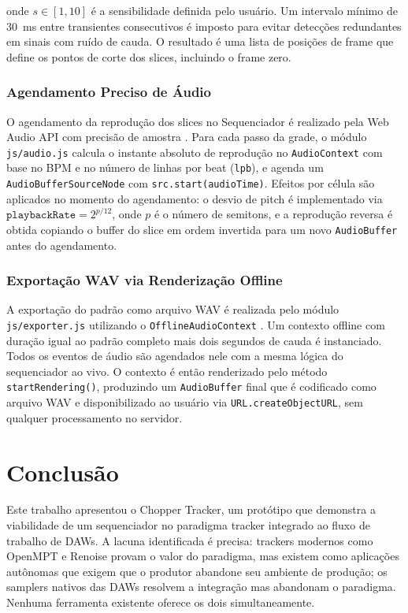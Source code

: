 \documentclass[portuguese]{sbc2025}
\begin{document}
onde $s \in [1,10]$ é a sensibilidade definida pelo usuário. Um intervalo mínimo de 30~ms entre transientes consecutivos é imposto para evitar detecções redundantes em sinais com ruído de cauda. O resultado é uma lista de posições de frame que define os pontos de corte dos slices, incluindo o frame zero.

\subsubsection{Agendamento Preciso de Áudio}

O agendamento da reprodução dos slices no Sequenciador é realizado pela Web Audio API com precisão de amostra \citep{webaudioapi2021}. Para cada passo da grade, o módulo \texttt{js/audio.js} calcula o instante absoluto de reprodução no \texttt{AudioContext} com base no BPM e no número de linhas por beat (\texttt{lpb}), e agenda um \texttt{AudioBufferSourceNode} com \texttt{src.start(audioTime)}. Efeitos por célula são aplicados no momento do agendamento: o desvio de pitch é implementado via $\texttt{playbackRate} = 2^{p/12}$, onde $p$ é o número de semitons, e a reprodução reversa é obtida copiando o buffer do slice em ordem invertida para um novo \texttt{AudioBuffer} antes do agendamento.

\subsubsection{Exportação WAV via Renderização Offline}

A exportação do padrão como arquivo WAV é realizada pelo módulo \texttt{js/exporter.js} utilizando o \texttt{OfflineAudioContext} \citep{webaudioapi2021}. Um contexto offline com duração igual ao padrão completo mais dois segundos de cauda é instanciado. Todos os eventos de áudio são agendados nele com a mesma lógica do sequenciador ao vivo. O contexto é então renderizado pelo método \texttt{startRendering()}, produzindo um \texttt{AudioBuffer} final que é codificado como arquivo WAV e disponibilizado ao usuário via \texttt{URL.createObjectURL}, sem qualquer processamento no servidor.


\section{Conclusão}

Este trabalho apresentou o Chopper Tracker, um protótipo que demonstra a viabilidade de um sequenciador no paradigma tracker integrado ao fluxo de trabalho de DAWs. A lacuna identificada é precisa: trackers modernos como OpenMPT e Renoise provam o valor do paradigma, mas existem como aplicações autônomas que exigem que o produtor abandone seu ambiente de produção; os samplers nativos das DAWs resolvem a integração mas abandonam o paradigma. Nenhuma ferramenta existente oferece os dois simultaneamente.
\end{document}

